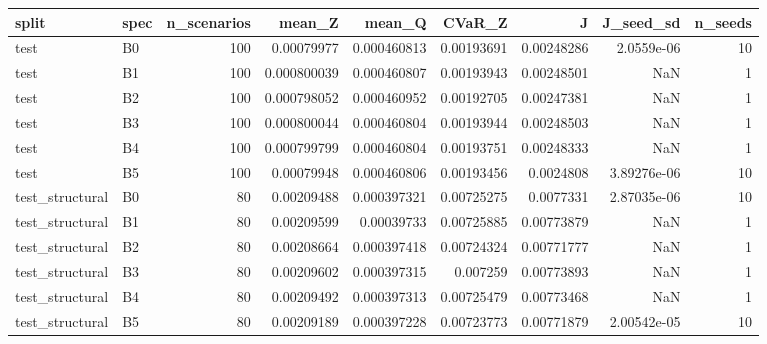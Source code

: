 \begin{tabular}{llrrrrrrr}
\toprule
split & spec & n\_scenarios & mean\_Z & mean\_Q & CVaR\_Z & J & J\_seed\_sd & n\_seeds \\
\midrule
test & B0 & 100 & 0.00079977 & 0.000460813 & 0.00193691 & 0.00248286 & 2.0559e-06 & 10 \\
test & B1 & 100 & 0.000800039 & 0.000460807 & 0.00193943 & 0.00248501 & NaN & 1 \\
test & B2 & 100 & 0.000798052 & 0.000460952 & 0.00192705 & 0.00247381 & NaN & 1 \\
test & B3 & 100 & 0.000800044 & 0.000460804 & 0.00193944 & 0.00248503 & NaN & 1 \\
test & B4 & 100 & 0.000799799 & 0.000460804 & 0.00193751 & 0.00248333 & NaN & 1 \\
test & B5 & 100 & 0.00079948 & 0.000460806 & 0.00193456 & 0.0024808 & 3.89276e-06 & 10 \\
test\_structural & B0 & 80 & 0.00209488 & 0.000397321 & 0.00725275 & 0.0077331 & 2.87035e-06 & 10 \\
test\_structural & B1 & 80 & 0.00209599 & 0.00039733 & 0.00725885 & 0.00773879 & NaN & 1 \\
test\_structural & B2 & 80 & 0.00208664 & 0.000397418 & 0.00724324 & 0.00771777 & NaN & 1 \\
test\_structural & B3 & 80 & 0.00209602 & 0.000397315 & 0.007259 & 0.00773893 & NaN & 1 \\
test\_structural & B4 & 80 & 0.00209492 & 0.000397313 & 0.00725479 & 0.00773468 & NaN & 1 \\
test\_structural & B5 & 80 & 0.00209189 & 0.000397228 & 0.00723773 & 0.00771879 & 2.00542e-05 & 10 \\
\bottomrule
\end{tabular}
